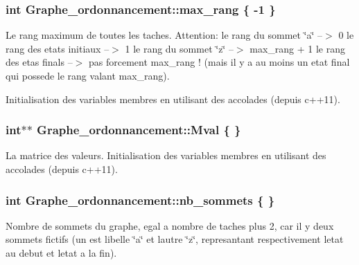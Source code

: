 \subsubsection[{\texorpdfstring{max\+\_\+rang}{max_rang}}]{\setlength{\rightskip}{0pt plus 5cm}int Graphe\+\_\+ordonnancement\+::max\+\_\+rang \{ -\/1 \}}\hypertarget{structGraphe__ordonnancement_a6aa4fd24dfbccf0929b893cb93e7fb6b}{}\label{structGraphe__ordonnancement_a6aa4fd24dfbccf0929b893cb93e7fb6b}
Le rang maximum de toutes les taches. Attention\+: le rang du sommet \char`\"{}a\char`\"{} --$>$ 0 le rang des etats initiaux --$>$ 1 le rang du sommet \char`\"{}z\char`\"{} --$>$ max\+\_\+rang + 1 le rang des etas finals --$>$ pas forcement max\+\_\+rang ! (mais il y a au moins un etat final qui possede le rang valant max\+\_\+rang).

Initialisation des variables membres en utilisant des accolades (depuis c++11). 
\subsubsection[{\texorpdfstring{Mval}{Mval}}]{\setlength{\rightskip}{0pt plus 5cm}int$\ast$$\ast$ Graphe\+\_\+ordonnancement\+::\+Mval \{ \}}\hypertarget{structGraphe__ordonnancement_afd38a144a1165aa9b03c71ef16c43e49}{}\label{structGraphe__ordonnancement_afd38a144a1165aa9b03c71ef16c43e49}
La matrice des valeurs. Initialisation des variables membres en utilisant des accolades (depuis c++11). 
\subsubsection[{\texorpdfstring{nb\+\_\+sommets}{nb_sommets}}]{\setlength{\rightskip}{0pt plus 5cm}int Graphe\+\_\+ordonnancement\+::nb\+\_\+sommets \{ \}}\hypertarget{structGraphe__ordonnancement_a401dd0e1053f6d1c6673b8da7cebeca4}{}\label{structGraphe__ordonnancement_a401dd0e1053f6d1c6673b8da7cebeca4}
Nombre de sommets du graphe, egal a nombre de taches plus 2, car il y deux sommets fictifs (un est libelle \char`\"{}a\char`\"{} et l\textquotesingle{}autre \char`\"{}z\char`\"{}, represantant respectivement l\textquotesingle{}etat au debut et l\textquotesingle{}etat a la fin). 
